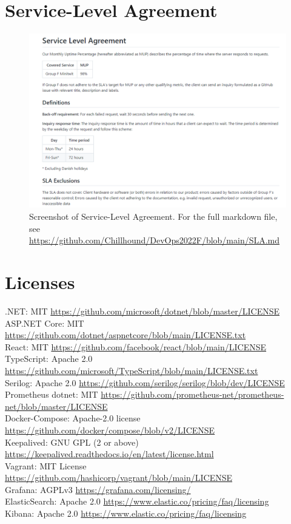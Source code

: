 \appendix
\section{Service-Level Agreement}
\begin{figure}[H]
    \label{app:SLA}
    \centering
    \includegraphics[width = \textwidth]{images/SLA.png}
    \caption{Screenshot of Service-Level Agreement. For the full markdown file, see \url{https://github.com/Chillhound/DevOps2022F/blob/main/SLA.md}}
\end{figure}

\section{Licenses} \label{ssec:licences}
.NET: MIT \url{https://github.com/microsoft/dotnet/blob/master/LICENSE} \\
ASP.NET Core: MIT \url{https://github.com/dotnet/aspnetcore/blob/main/LICENSE.txt} \\
React: MIT \url{https://github.com/facebook/react/blob/main/LICENSE} \\
TypeScript: Apache 2.0 \url{https://github.com/microsoft/TypeScript/blob/main/LICENSE.txt} \\
Serilog: Apache 2.0 \url{https://github.com/serilog/serilog/blob/dev/LICENSE} \\
Prometheus dotnet: MIT \url{https://github.com/prometheus-net/prometheus-net/blob/master/LICENSE} \\
Docker-Compose: Apache-2.0 license \url{https://github.com/docker/compose/blob/v2/LICENSE} \\
Keepalived: GNU GPL (2 or above) \url{https://keepalived.readthedocs.io/en/latest/license.html} \\
Vagrant: MIT License \url{https://github.com/hashicorp/vagrant/blob/main/LICENSE} \\
Grafana: AGPLv3 \url{https://grafana.com/licensing/} \\
ElasticSearch: Apache 2.0 \url{https://www.elastic.co/pricing/faq/licensing} \\
Kibana: Apache 2.0 \url{https://www.elastic.co/pricing/faq/licensing} \\

